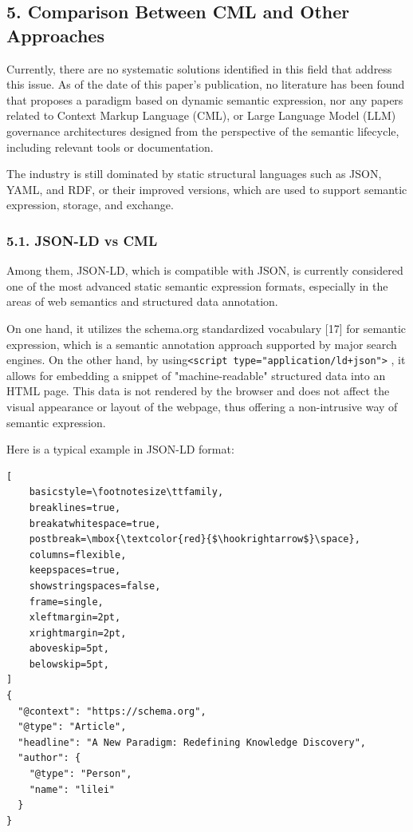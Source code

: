\documentclass[conference]{IEEEtran}
\begin{document}
\subsection{5. Comparison Between CML and Other
Approaches}\label{5-comparison-between-cml-and-other-approaches}

Currently, there are no systematic solutions identified in this field
that address this issue. As of the date of this paper's publication, no
literature has been found that proposes a paradigm based on dynamic
semantic expression, nor any papers related to Context Markup Language
(CML), or Large Language Model (LLM) governance architectures designed
from the perspective of the semantic lifecycle, including relevant tools
or documentation.

The industry is still dominated by static structural languages such as
JSON, YAML, and RDF, or their improved versions, which are used to
support semantic expression, storage, and exchange.

\subsubsection{5.1. JSON-LD vs CML}\label{51-json-ld-vs-cml}

Among them, JSON-LD, which is compatible with JSON, is currently
considered one of the most advanced static semantic expression formats,
especially in the areas of web semantics and structured data annotation.

On one hand, it utilizes the schema.org standardized vocabulary {[}17{]}
for semantic expression, which is a semantic annotation approach
supported by major search engines. On the other hand, by
using\texttt{\textless{}script\ type="application/ld+json"\textgreater{}}
, it allows for embedding a snippet of "machine-readable" structured
data into an HTML page. This data is not rendered by the browser and
does not affect the visual appearance or layout of the webpage, thus
offering a non-intrusive way of semantic expression.

Here is a typical example in JSON-LD format:

\begin{lstlisting}[
    basicstyle=\footnotesize\ttfamily,
    breaklines=true,
    breakatwhitespace=true,
    postbreak=\mbox{\textcolor{red}{$\hookrightarrow$}\space},
    columns=flexible,
    keepspaces=true,
    showstringspaces=false,
    frame=single,
    xleftmargin=2pt,
    xrightmargin=2pt,
    aboveskip=5pt,
    belowskip=5pt,
]
{
  "@context": "https://schema.org",
  "@type": "Article",
  "headline": "A New Paradigm: Redefining Knowledge Discovery",
  "author": {
    "@type": "Person",
    "name": "lilei"
  }
}
\end{lstlisting}
\end{document}
